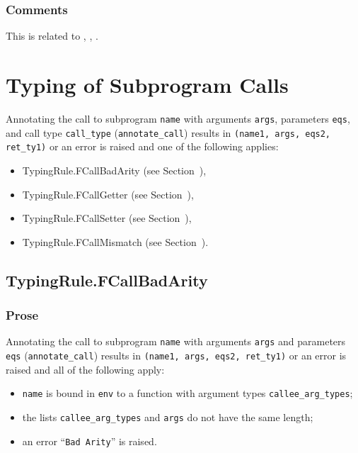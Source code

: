 \documentclass{book}
\begin{document}
\begin{itemize}
\subsection{Comments}
    This is related to , , .

\chapter{Typing of Subprogram Calls \label{chap:TypingSubprogramCalls}}

Annotating the call to subprogram \texttt{name} with arguments \texttt{args},
parameters \texttt{eqs}, and call type \texttt{call\_type} (\texttt{annotate\_call}) results in \texttt{(name1,
args, eqs2, ret\_ty1)} or an error is raised and one of the following applies:
\begin{itemize}
\item TypingRule.FCallBadArity (see Section~),
\item TypingRule.FCallGetter (see Section~),
\item TypingRule.FCallSetter (see Section~),
\item TypingRule.FCallMismatch (see Section~).
\end{itemize}

\section{TypingRule.FCallBadArity \label{sec:TypingRule.FCallBadArity}}

  \subsection{Prose}
  Annotating the call to subprogram \texttt{name} with arguments \texttt{args}
and parameters \texttt{eqs} (\texttt{annotate\_call}) results in
\texttt{(name1, args, eqs2, ret\_ty1)} or an error is raised and all of the
following apply:
   \begin{itemize}
   \item \texttt{name} is bound in \texttt{env} to a function with argument types \texttt{callee\_arg\_types};
   \item the lists \texttt{callee\_arg\_types} and \texttt{args} do not have the same length;
   \item an error ``\texttt{Bad Arity}'' is raised.
   \end{itemize}


\end{itemize}
\end{document}
